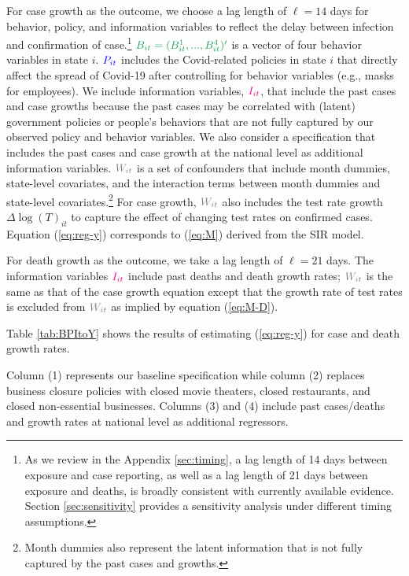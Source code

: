 \documentclass[11pt,reqno,letter]{amsart}
\theoremstyle{definition}
\def\bcolor{\color{ForestGreen}}
\def\pcolor{\color{blue}}
\def\icolor{\color{magenta}}
\def\wcolor{\color{gray}}
\begin{document}
For case growth as the outcome, we choose a lag length of $\ell=14$ days for behavior, policy, and information variables to reflect the delay between infection and
confirmation of case.\footnote{As we review in the Appendix \ref{sec:timing},
  a lag length of 14 days between exposure and case reporting, as well as a lag length of 21 days between exposure and deaths, is broadly consistent with currently
  available evidence. Section \ref{sec:sensitivity} provides a sensitivity analysis under different timing assumptions.  }   $\bcolor B_{it}=(B_{it}^1,...,B_{it}^4)'$ is a vector of four behavior
variables  in state $i$. $\pcolor P_{it}$ includes the Covid-related policies
in state $i$  that directly affect the spread of Covid-19
after controlling for behavior variables (e.g., masks for employees).
We include information variables,  $\icolor I_{it}$, that include the past cases and case growths
because  the past cases may be
correlated with (latent) government  policies or people's behaviors
that are not fully captured by our observed policy and behavior
variables. We also consider a specification that includes the past cases and case growth at the national level as additional information variables. $\wcolor W_{it}$ is a set of confounders that include month dummies, state-level covariates,  and the interaction terms between month dummies and state-level covariates.\footnote{Month dummies also represent the latent information that is not fully captured by the past cases and growths.}
For case growth, $\wcolor W_{it}$ also includes the  test rate growth  $\Delta \log(T)_{it}$  to capture the effect of changing test rates on confirmed cases.
Equation (\ref{eq:reg-y}) corresponds to (\ref{eq:M})  derived from the SIR model.



For death growth as the outcome, we take a lag length of $\ell=21$ days. The information variables $\icolor I_{it}$ include  past deaths and death growth rates;  $\wcolor W_{it}$ is the same as that of the case growth equation except that the growth rate of test rates is excluded from $\wcolor W_{it}$ as implied by equation (\ref{eq:M-D}).


Table \ref{tab:BPItoY} shows
the results of estimating
(\ref{eq:reg-y}) for case and death growth rates. %

Column (1) represents our baseline specification while column (2) replaces business closure policies with closed movie theaters, closed restaurants, and closed non-essential businesses. Columns (3) and (4) include past cases/deaths and growth rates at national level as additional regressors.
\end{document}

